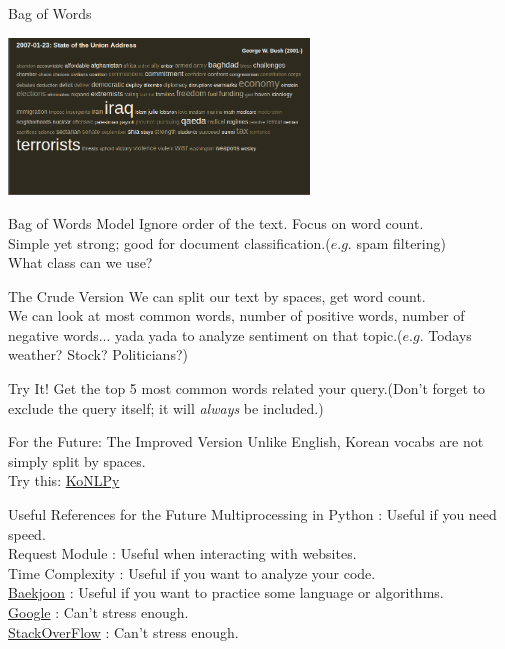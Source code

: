\documentclass{beamer}
\begin{document}
\begin{frame}{Bag of Words}
  \begin{center}
  \includegraphics[width=80mm]{./bow.png}
  \end{center}
\end{frame}

\begin{frame}{Bag of Words Model}
  Ignore order of the text. Focus on word count.\\
  Simple yet strong; good for document classification.($e.g.$ spam filtering)\\
  What class can we use?
\end{frame}

\begin{frame}{The Crude Version}
  We can split our text by spaces, get word count.\\
  We can look at most common words, number of positive words, number of
  negative words... yada yada to analyze sentiment on that topic.($e.g.$ Todays
  weather? Stock? Politicians?)
\end{frame}

\begin{frame}{Try It!}
  Get the top 5 most common words related your query.(Don't forget to exclude
  the query itself; it will \textit{always} be included.)
\end{frame}

\begin{frame}{For the Future: The Improved Version}
  Unlike English, Korean vocabs are not simply split by spaces.\\
  Try this: \href{https://konlpy-ko.readthedocs.io/ko/v0.4.3/}{KoNLPy}
\end{frame}

\begin{frame}{Useful References for the Future}
  Multiprocessing in Python : Useful if you need speed.\\
  Request Module : Useful when interacting with websites.\\
  Time Complexity : Useful if you want to analyze your code.\\
  \href{https://acmicpc.net}{Baekjoon} : Useful if you want to practice some
  language or algorithms.\\
  \href{https://www.google.com}{Google} : Can't stress enough.\\
  \href{https://www.stackoverflow.com}{StackOverFlow} : Can't stress enough.\\
\end{frame}
\end{document}

